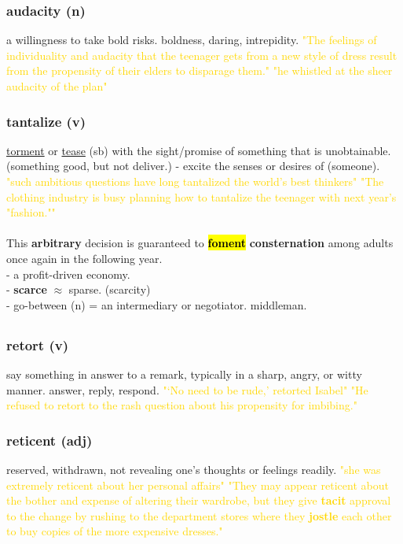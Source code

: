 \documentclass{proc}
\begin{document}
	\subsubsection{\textcolor{brickred}{audacity} (n)}
	a willingness to take bold risks. boldness,
	daring,
	intrepidity.
	\textcolor{gold}{"The feelings of individuality and audacity that the teenager gets from a  new style of dress result from the propensity of their elders to disparage them." "he whistled at the sheer audacity of the plan"}
	
	\subsubsection{\textcolor{brickred}{tantalize} (v)}
	\underline{torment} or \underline{tease} (sb) with the sight/promise of something that is unobtainable. (something good, but not deliver.) - excite the senses or desires of (someone).
	\textcolor{gold}{"such ambitious questions have long tantalized the world's best thinkers" "The clothing industry is busy planning how to tantalize the teenager with next year's "fashion.""}\\\\
	This \textbf{arbitrary} decision is guaranteed to \textbf{\hl{foment}} \textbf{consternation} among adults once again in the following year.\\
	- a profit-driven economy.\\
	- \textbf{scarce} $\approx$ sparse. (scarcity)\\
	- go-between (n) = an intermediary or negotiator. middleman.
	
	\newpage
	\subsection{}
	\subsubsection{\textcolor{brickred}{retort} (v)}
	say something in answer to a remark, typically in a sharp, angry, or witty manner. answer,
	reply,
	respond.
	\textcolor{gold}{"‘No need to be rude,’ retorted Isabel" "He refused to retort to the rash question about his propensity for imbibing."}
	
	\subsubsection{\textcolor{brickred}{reticent} (adj)}
	reserved,
	withdrawn, not revealing one's thoughts or feelings readily.
	\textcolor{gold}{"she was extremely reticent about her personal affairs" "They may appear reticent about the bother and expense of altering their wardrobe, but they give \textbf{tacit} approval to the change by rushing to the department stores where they \textbf{jostle} each other to buy copies of the more expensive dresses."}
	
\end{document}

